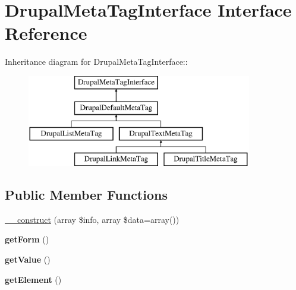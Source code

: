 \hypertarget{interfaceDrupalMetaTagInterface}{
\section{DrupalMetaTagInterface Interface Reference}
\label{interfaceDrupalMetaTagInterface}
}
Inheritance diagram for DrupalMetaTagInterface::\begin{figure}[H]
\begin{center}
\leavevmode
\includegraphics[height=4cm]{interfaceDrupalMetaTagInterface}
\end{center}
\end{figure}
\subsection*{Public Member Functions}
\begin{DoxyCompactItemize}
\item 
\hyperlink{interfaceDrupalMetaTagInterface_a21e8f7f5fb413a733c967249da89e8e3}{\_\-\_\-construct} (array \$info, array \$data=array())
\item 
\hypertarget{interfaceDrupalMetaTagInterface_a8eca76497eb011435cb73a7df57f2f93}{
{\bfseries getForm} ()}
\label{interfaceDrupalMetaTagInterface_a8eca76497eb011435cb73a7df57f2f93}

\item 
\hypertarget{interfaceDrupalMetaTagInterface_a4e34f5fd6935a3e4e16a8d6cad3a0f8f}{
{\bfseries getValue} ()}
\label{interfaceDrupalMetaTagInterface_a4e34f5fd6935a3e4e16a8d6cad3a0f8f}

\item 
\hypertarget{interfaceDrupalMetaTagInterface_a68a2ec16df1f7e81789a8d306946d41e}{
{\bfseries getElement} ()}
\label{interfaceDrupalMetaTagInterface_a68a2ec16df1f7e81789a8d306946d41e}

\end{DoxyCompactItemize}


